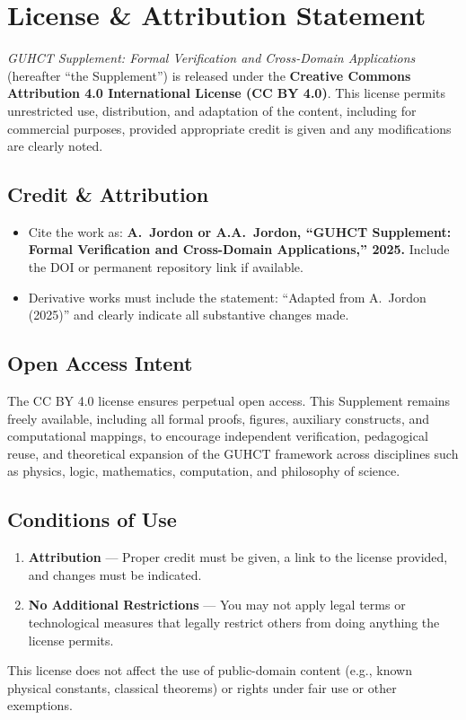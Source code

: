 \documentclass[11pt,a4paper]{article}
\begin{document}
\section{License \& Attribution Statement}
\label{sec:license}
\emph{GUHCT Supplement: Formal Verification and Cross-Domain Applications} (hereafter “the Supplement”) is released under the
\textbf{Creative Commons Attribution 4.0 International License (CC BY 4.0)}.
This license permits unrestricted use, distribution, and adaptation of the content, including for commercial purposes, provided appropriate credit is given and any modifications are clearly noted.

\subsection*{Credit \& Attribution}
\begin{itemize}
\item Cite the work as: \textbf{A.~Jordon or A.A.~Jordon, “GUHCT Supplement: Formal Verification and Cross-Domain Applications,” 2025.} Include the DOI or permanent repository link if available.
\item Derivative works must include the statement: “Adapted from A.~Jordon (2025)” and clearly indicate all substantive changes made.
\end{itemize}

\subsection*{Open Access Intent}
The CC BY 4.0 license ensures perpetual open access. This Supplement remains freely available, including all formal proofs, figures, auxiliary constructs, and computational mappings, to encourage independent verification, pedagogical reuse, and theoretical expansion of the GUHCT framework across disciplines such as physics, logic, mathematics, computation, and philosophy of science.

\subsection*{Conditions of Use}
\begin{enumerate}
\item \textbf{Attribution} — Proper credit must be given, a link to the license provided, and changes must be indicated.
\item \textbf{No Additional Restrictions} — You may not apply legal terms or technological measures that legally restrict others from doing anything the license permits.
\end{enumerate}
This license does not affect the use of public-domain content (e.g., known physical constants, classical theorems) or rights under fair use or other exemptions.
\end{document}
